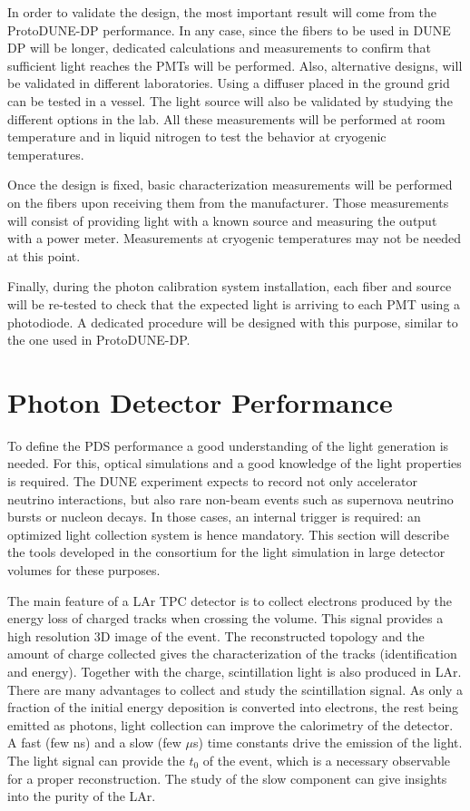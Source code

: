 In order to validate the design, the most important result will come from the ProtoDUNE-DP performance. In any case, since the fibers to be used in DUNE DP will be longer, dedicated calculations and measurements to confirm that sufficient light reaches the PMTs will be performed. Also, alternative designs, will be validated in different laboratories. Using a diffuser placed in the ground grid can be tested in a vessel. The light source will also be validated by studying the different options in the lab. All these measurements will be performed at room temperature and in liquid nitrogen to test the behavior at cryogenic temperatures.

Once the design is fixed, basic characterization measurements will be performed on the fibers upon receiving them from the manufacturer. Those measurements will consist of providing light with a known source and measuring the output with a power meter. Measurements at cryogenic temperatures may not be needed at this point.

Finally, during the photon calibration system installation, each fiber and source will be re-tested to check that the expected light is arriving to each PMT using a photodiode. A dedicated procedure will be designed with this purpose, similar to the one used in ProtoDUNE-DP.

\section{Photon Detector Performance}
\label{sec:fddp-pd-6}

To define the PDS performance a good understanding of the light generation is needed. For this, optical simulations and a good knowledge of the light properties is required. The DUNE experiment expects to record not only accelerator neutrino interactions, but also rare non-beam events such as supernova neutrino bursts or nucleon decays. In those cases, an internal trigger is required: an optimized light collection system is hence mandatory. This section will describe the tools developed in the consortium for the light simulation in large detector volumes for these purposes.

The main feature of a LAr TPC detector is to collect electrons produced by the energy loss of charged tracks when crossing the volume. This signal provides a high resolution 3D image of the event. The reconstructed topology and the amount of charge collected gives the characterization of the tracks (identification and energy). Together with the charge, scintillation light is also produced in LAr. There are many advantages to collect and study the scintillation signal. As only a fraction of the initial energy deposition is converted into electrons, the rest being emitted as photons, light collection can improve the calorimetry of the detector. A fast (few ns) and a slow (few $\mu$s) time constants drive the emission of the light. The light signal can provide the $t_0$ of the event, which is a necessary observable for a proper reconstruction. The study of the slow component can give insights into the purity of the LAr. 

